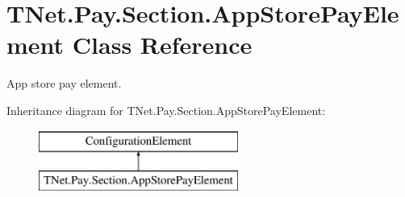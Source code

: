 \hypertarget{class_t_net_1_1_pay_1_1_section_1_1_app_store_pay_element}{}\section{T\+Net.\+Pay.\+Section.\+App\+Store\+Pay\+Element Class Reference}
\label{class_t_net_1_1_pay_1_1_section_1_1_app_store_pay_element}


App store pay element.  


Inheritance diagram for T\+Net.\+Pay.\+Section.\+App\+Store\+Pay\+Element\+:\begin{figure}[H]
\begin{center}
\leavevmode
\includegraphics[height=2.000000cm]{class_t_net_1_1_pay_1_1_section_1_1_app_store_pay_element}
\end{center}
\end{figure}
